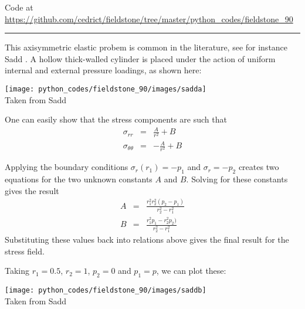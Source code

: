 

\begin{center}
Code at \url{https://github.com/cedrict/fieldstone/tree/master/python_codes/fieldstone_90}
\end{center}

\par\noindent\rule{\textwidth}{0.4pt}


This axisymmetric elastic probem is common in the literature, see for instance Sadd \cite{sadd14}.
A hollow thick-walled cylinder is placed under the
action of uniform internal and external pressure loadings, as shown here:

\begin{center}
\texttt{[image: python\_codes/fieldstone\_90/images/sadda]}\\
{\captionfont Taken from Sadd \cite{sadd14}}
\end{center}
One can easily show that the stress components are such that
\begin{eqnarray}
\sigma_{rr} &=& \frac{A}{r^2} + B \\
\sigma_{\theta\theta} &=& -\frac{A}{r^2} + B
\end{eqnarray}

Applying the boundary conditions 
$\sigma_r(r_1)=-p_1$ and $\sigma_r=-p_2$ 
creates two equations
for the two unknown constants $A$ and $B$. 
Solving for these constants gives the result
\begin{eqnarray}
A &=& \frac{r_1^2r_2^2(p_2-p_1)}{r_2^2-r_1^2} \\
B &=& \frac{r_1^2p_1-r_2^2p_2 )}{r_2^2-r_1^2} 
\end{eqnarray}
Substituting these values back into relations above gives the final result for the stress field.

Taking $r_1=0.5$, $r_2=1$, $p_2=0$ and $p_1=p$, we can plot these:
\begin{center}
\texttt{[image: python\_codes/fieldstone\_90/images/saddb]}\\
{\captionfont Taken from Sadd \cite{sadd14}}
\end{center}

